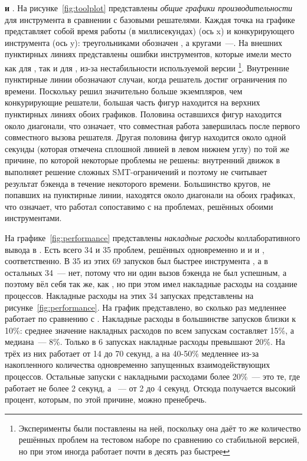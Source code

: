 \textbf{\ringenSync{} и \theringenCICI{} }. На рисунке~\ref{fig:toolplot} представлены \textit{общие графики производительности} для инструмента \theringenCICI{} в сравнении с базовыми решателями. Каждая точка на графике представляет собой время работы (в миллисекундах) \theringenCICI{} (ось x) и конкурирующего инструмента (ось y): треугольниками обозначен \theringen{}, а кругами~---\racer{}.
На внешних пунктирных линиях представлены ошибки инструментов, которые имели место как для \racer{}, так и для \theringenCICI{}, из-за нестабильности используемой версии \racer{}\footnote{Эксперименты были поставлены на ней, поскольку она даёт то же количество решённых проблем на тестовом наборе по сравнению со стабильной версией, но при этом иногда работает почти в десять раз быстрее}. Внутренние пунктирные линии обозначают случаи, когда решатель достиг ограничения по времени. Поскольку \theringenCICI{} решил значительно больше экземпляров, чем конкурирующие решатели, большая часть фигур находится на верхних пунктирных линиях обоих графиков. Половина оставшихся фигур находится около диагонали, что означает, что совместная работа завершилась после первого совместного вызова решателя. Другая половина фигур находится около одной секунды (которая отмечена сплошной линией в левом нижнем углу) по той же причине, по которой некоторые проблемы не решены: внутренний движок \racer{} в \theringenCICI{} выполняет решение сложных SMT-ограничений и поэтому не считывает результат бэкенда в течение некоторого времени. Большинство кругов, не попавших на пунктирные линии, находятся около диагонали на обоих графиках, что означает, что \theringenCICI{} работал сопоставимо с \racer{} на проблемах, решённых обоими инструментами.

На графике~\ref{fig:performance} представлены \textit{накладные расходы} коллаборативного вывода в \theringenCICI{}. Есть всего 34 и 35 проблем, решённых одновременно \racer{} и \ringenCICI{\cvc{}} и \racer{} и \ringenCICI{\vampire{}}, соответственно. В 35 из этих 69 запусков \theringenCICI{} был быстрее инструмента \racer{}, а в остальных 34~--- нет, потому что ни один вызов бэкенда не был успешным, а поэтому \theringenCICI{} вёл себя так же, как \racer{}, но при этом имел накладные расходы на создание процессов. Накладные расходы на этих 34 запусках представлены на рисунке~\ref{fig:performance}. На график представлено, во сколько раз медленнее работает \theringenCICI{} по сравнению с \racer{}. Накладные расходы в большинстве запусков близки к 10\%: среднее значение накладных расходов по всем запускам составляет 15\%, а медиана~--- 8\%.
Только в 6 запусках накладные расходы превышают 20\%. На трёх из них \racer{} работает от 14 до 70 секунд, а \theringenCICI{} на 40-50\% медленнее из-за накопленного количества одновременно запущенных взаимодействующих процессов. Остальные запуски с накладными расходами более 20\%~--- это те, где \racer{} работает не более 2 секунд, а \theringenCICI{}~--- от 2 до 4 секунд. Отсюда получается высокий процент, которым, по этой причине, можно пренебречь.

